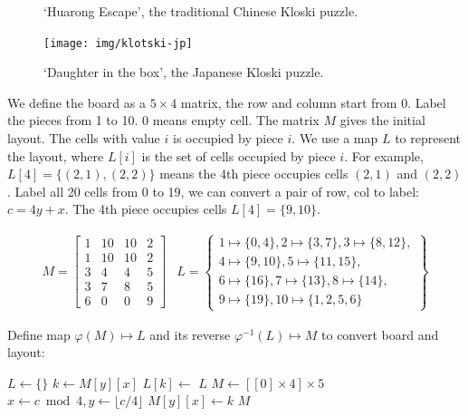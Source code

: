 \documentclass[b5paper]{article}
\begin{document}
\begin{figure}[htbp]
 \centering
  \hspace{.01\textwidth}
 \caption{`Huarong Escape', the traditional Chinese Kloski puzzle.}
 \label{fig:klotski-cn}
\end{figure}

\begin{figure}[htbp]
 \centering
 \texttt{[image: img/klotski-jp]}
 \caption{`Daughter in the box', the Japanese Kloski puzzle.}
 \label{fig:klotski-jp}
\end{figure}

We define the board as a $5 \times 4$ matrix, the row and column start from 0. Label the pieces from 1 to 10. 0 means empty cell. The matrix $M$ gives the initial layout. The cells with value $i$ is occupied by piece $i$. We use a map $L$ to represent the layout, where $L[i]$ is the set of cells occupied by piece $i$. For example, $L[4] = \{(2, 1), (2, 2)\}$ means the 4th piece occupies cells $(2, 1)$ and $(2, 2)$. Label all 20 cells from 0 to 19, we can convert a pair of row, col to label: $c = 4y + x$. The 4th piece occupies cells $L[4] = \{9, 10\}$.

\[
\begin{array}{cc}
M = \left [
  \begin{array}{cccc}
  1 & 10 & 10 & 2 \\
  1 & 10 & 10 & 2 \\
  3 & 4 & 4 & 5 \\
  3 & 7 & 8 & 5 \\
  6 & 0 & 0 & 9
  \end{array}
\right ] &
L = \left \{
  \begin{array}{l}
  1 \mapsto \{0, 4\}, 2 \mapsto \{3, 7\}, 3 \mapsto \{8, 12\}, \\
  4 \mapsto \{9, 10\}, 5 \mapsto \{11, 15\}, \\
  6 \mapsto \{16\}, 7 \mapsto \{ 13 \}, 8 \mapsto \{ 14 \}, \\
  9 \mapsto \{ 19 \}, 10 \mapsto \{1, 2, 5, 6\}
  \end{array}
\right \}
\end{array}
\]

Define map $\varphi(M) \mapsto L$ and its reverse $\varphi^{-1}(L) \mapsto M$ to convert board and layout:

\begin{algorithmic}[1]
  \State $L \gets \{ \}$
      \State $k \gets M[y][x]$
      \State $L[k] \gets$ 
    \EndFor
  \EndFor
  \State \Return $L$
\EndFunction
\Statex
{}
  \State $M \gets [[0] \times 4] \times 5$
      \State $x \gets c \bmod 4, y \gets \lfloor c / 4\rfloor$
      \State $M[y][x] \gets k$
    \EndFor
  \EndFor
  \State \Return $M$
\EndFunction
\end{algorithmic}
\end{document}
